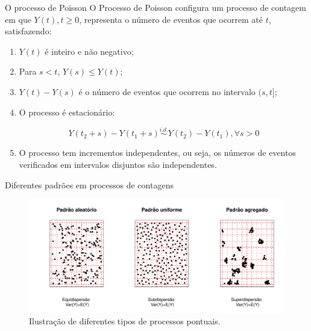 \documentclass[10pt, aspectratio=169]{beamer}\usepackage[]{graphicx}\usepackage[]{color}
\begin{document}
\begin{frame}{O processo de Poisson}
O Processo de Poisson configura um processo de contagem em que 
$Y(t),t\geqslant 0$, representa o número de eventos que ocorrem até $t$, 
satisfazendo:
\vspace{0,5cm}
\begin{enumerate}
  \item $Y(t)$ é inteiro e não negativo;
  \item Para $s<t$, $Y(s)\leq Y(t)$;
  \item $Y(t)-Y(s)$ é o número de eventos que ocorrem no intervalo $(s,t]$;
\item O processo é estacionário:

$$
  Y(t_{2}+s)-Y(t_{1}+s) \overset{i.d. }{\sim}Y(t_{2})-Y(t_{1}), \forall s>0
$$
  
\item O processo tem incrementos independentes, ou seja, os números de 
eventos verificados em intervalos disjuntos são independentes.
\end{enumerate}

\end{frame}

\begin{frame}{Diferentes padrões em processos de contagens}

\begin{figure}[h]
\includegraphics[scale=0.6]{images/processos14.pdf}
\caption{Ilustração de diferentes tipos de processos pontuais.}
\label{Fig2}
\centering

\end{figure}
\end{frame}
\end{document}

